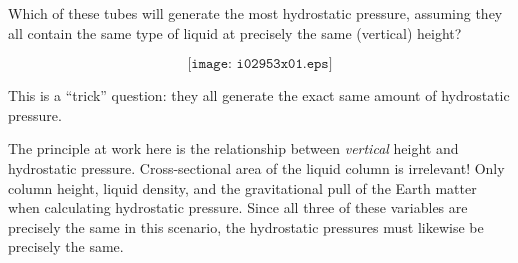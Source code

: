 

Which of these tubes will generate the most hydrostatic pressure, assuming they all contain the same type of liquid at precisely the same (vertical) height?

$$\texttt{[image: i02953x01.eps]}$$







This is a ``trick'' question: they all generate the exact same amount of hydrostatic pressure.

\vskip 10pt

The principle at work here is the relationship between {\it vertical} height and hydrostatic pressure.  Cross-sectional area of the liquid column is irrelevant!  Only column height, liquid density, and the gravitational pull of the Earth matter when calculating hydrostatic pressure.  Since all three of these variables are precisely the same in this scenario, the hydrostatic pressures must likewise be precisely the same.











